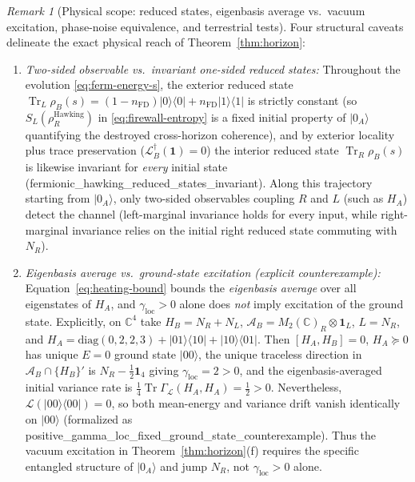 \documentclass[11pt,a4paper]{article}
\theoremstyle{definition}
\theoremstyle{remark}
\newtheorem{remark}{Remark}
\newcommand{\Tr}{\operatorname{Tr}}
\newcommand{\cA}{\mathcal{A}}
\newcommand{\cL}{\mathcal{L}}
\newcommand{\bbC}{\mathbb{C}}
\newcommand{\1}{\mathbf{1}}
\newcommand{\code}[1]{{\footnotesize\ttfamily #1}}
\begin{document}
\begin{remark}[Physical scope: reduced states, eigenbasis average vs.\ vacuum excitation, phase-noise equivalence, and terrestrial tests]\label{rem:horizon-scope}
Four structural caveats delineate the exact physical reach of Theorem~\ref{thm:horizon}:
\begin{enumerate}
  \item \emph{Two-sided observable vs.\ invariant one-sided reduced states:} Throughout the evolution \eqref{eq:ferm-energy-s}, the exterior reduced state $\Tr_L\rho_B(s) = (1-n_{\mathrm{FD}})|0\rangle\langle 0| + n_{\mathrm{FD}}|1\rangle\langle 1|$ is strictly constant (so $S_L(\rho_R^{\mathrm{Hawking}})$ in \eqref{eq:firewall-entropy} is a fixed initial property of $|0_A\rangle$ quantifying the destroyed cross-horizon coherence), and by exterior locality plus trace preservation ($\cL_B^\dagger(\1)=0$) the interior reduced state $\Tr_R\rho_B(s)$ is likewise invariant for \emph{every} initial state (\code{fermionic\_\allowbreak hawking\_\allowbreak reduced\_\allowbreak states\_\allowbreak invariant}). Along this trajectory starting from $|0_A\rangle$, only two-sided observables coupling $R$ and $L$ (such as $H_A$) detect the channel (left-marginal invariance holds for every input, while right-marginal invariance relies on the initial right reduced state commuting with $N_R$).
  \item \emph{Eigenbasis average vs.\ ground-state excitation (explicit counterexample):} Equation~\eqref{eq:heating-bound} bounds the \emph{eigenbasis average} over all eigenstates of $H_A$, and $\gamma_{\mathrm{loc}}>0$ alone does \emph{not} imply excitation of the ground state. Explicitly, on $\bbC^4$ take $H_B = N_R + N_L$, $\cA_B = M_2(\bbC)_R\otimes\1_L$, $L = N_R$, and $H_A = \mathrm{diag}(0,2,2,3) + |01\rangle\langle 10| + |10\rangle\langle 01|$. Then $[H_A,H_B]=0$, $H_A\succeq 0$ has unique $E=0$ ground state $|00\rangle$, the unique traceless direction in $\cA_B\cap\{H_B\}'$ is $N_R-\frac{1}{2}\1_4$ giving $\gamma_{\mathrm{loc}} = 2 > 0$, and the eigenbasis-averaged initial variance rate is $\frac{1}{4}\Tr\Gamma_{\cL}(H_A,H_A) = \frac{1}{2} > 0$. Nevertheless, $\cL(|00\rangle\langle 00|) = 0$, so both mean-energy and variance drift vanish identically on $|00\rangle$ (formalized as \code{positive\_\allowbreak gamma\_\allowbreak loc\_\allowbreak fixed\_\allowbreak ground\_\allowbreak state\_\allowbreak counterexample}). Thus the vacuum excitation in Theorem~\ref{thm:horizon}(f) requires the specific entangled structure of $|0_A\rangle$ and jump $N_R$, not $\gamma_{\mathrm{loc}}>0$ alone.

\end{enumerate}
\end{remark}
\end{document}
